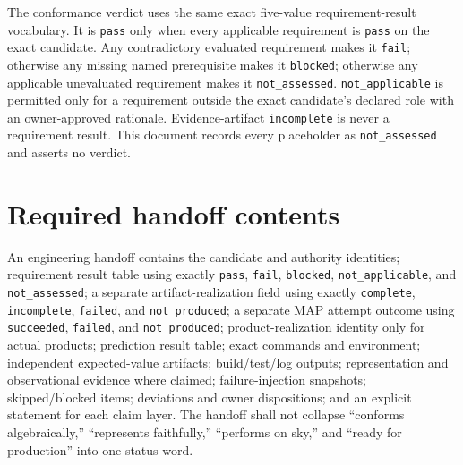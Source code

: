 \documentclass[10pt]{article}
\begin{document}
The conformance verdict uses the same exact five-value requirement-result
vocabulary. It is \texttt{pass} only when every applicable requirement is
\texttt{pass} on the exact candidate. Any contradictory evaluated requirement
makes it \texttt{fail}; otherwise any missing named prerequisite makes it
\texttt{blocked}; otherwise any applicable unevaluated requirement makes it
\texttt{not\_assessed}. \texttt{not\_applicable} is permitted only for a
requirement outside the exact candidate's declared role with an owner-approved
rationale. Evidence-artifact \texttt{incomplete} is never a requirement result.
This document records every placeholder as \texttt{not\_assessed} and asserts
no verdict.

\section*{Required handoff contents}

An engineering handoff contains the candidate and authority identities;
requirement result table using exactly \texttt{pass}, \texttt{fail},
\texttt{blocked}, \texttt{not\_applicable}, and \texttt{not\_assessed}; a
separate artifact-realization field using exactly \texttt{complete},
\texttt{incomplete}, \texttt{failed}, and \texttt{not\_produced}; a separate
MAP attempt outcome using \texttt{succeeded}, \texttt{failed}, and
\texttt{not\_produced}; product-realization
identity only for actual products; prediction result table; exact commands and
environment; independent expected-value artifacts; build/test/log outputs;
representation and observational evidence where claimed; failure-injection
snapshots; skipped/blocked items; deviations and owner dispositions; and an
explicit statement for each claim layer. The handoff shall not collapse
``conforms algebraically,'' ``represents faithfully,'' ``performs on sky,'' and
``ready for production'' into one status word.
\end{document}
